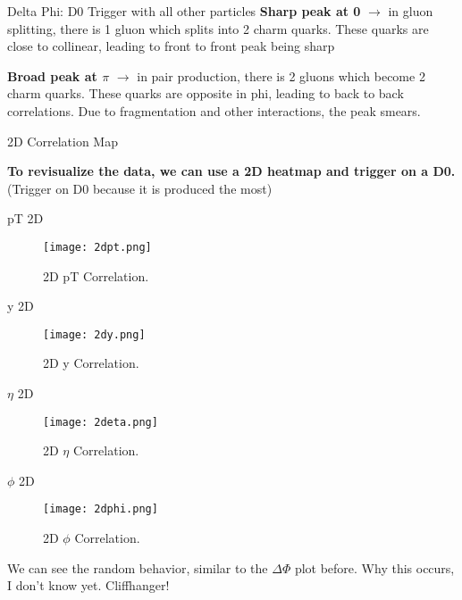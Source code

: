 \documentclass[10pt]{beamer}
\begin{document}
\begin{frame}{Delta Phi: D0 Trigger with all other particles}
\textbf{Sharp peak at 0} $\rightarrow$ in gluon splitting, there is 1 gluon which splits into 2 charm quarks. These quarks are close to collinear, leading to front to front peak being sharp

\textbf{Broad peak at $\pi$} $\rightarrow$ in pair production, there is 2 gluons which become 2 charm quarks. These quarks are opposite in phi, leading to back to back correlations. Due to fragmentation and other interactions, the peak smears.
\end{frame}

\begin{frame}{2D Correlation Map}

\textbf{To revisualize the data, we can use a 2D heatmap and trigger on a D0.} (Trigger on D0 because it is produced the most)
    
\end{frame}

\begin{frame}{pT 2D}
\begin{figure}
    \centering
    \texttt{[image: 2dpt.png]}
    \caption{2D pT Correlation.}
\end{figure}
    
\end{frame}

\begin{frame}{y 2D}
\begin{figure}
    \centering
    \texttt{[image: 2dy.png]}
    \caption{2D y Correlation.}
\end{figure}
    
\end{frame}

\begin{frame}{$\eta$ 2D}
\begin{figure}
    \centering
    \texttt{[image: 2deta.png]}
    \caption{2D $\eta$ Correlation.}
\end{figure}
    
\end{frame}

\begin{frame}{$\phi$ 2D}
\begin{figure}
    \centering
    \texttt{[image: 2dphi.png]}
    \caption{2D $\phi$ Correlation.}
\end{figure}
We can see the random behavior, similar to the $\Delta\Phi$ plot before. Why this occurs, I don't know yet. Cliffhanger!
\end{frame}
\end{document}

